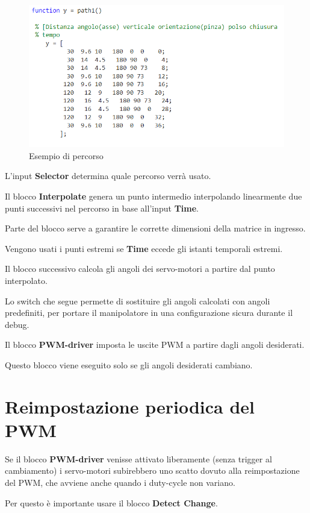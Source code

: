 \documentclass[12pt]{report}
\begin{document}
\begin{figure}
\includegraphics[width=\textwidth]{Path_structure}
\caption{Esempio di percorso}
\end{figure}

L'input \textbf{Selector} determina quale percorso verrà usato.

Il blocco \textbf{Interpolate} genera un punto intermedio interpolando linearmente due punti successivi nel percorso in base all'input \textbf{Time}.

Parte del blocco serve a garantire le corrette dimensioni della matrice in ingresso.

Vengono usati i punti estremi se \textbf{Time} eccede gli istanti temporali estremi.

Il blocco successivo calcola gli angoli dei servo-motori a partire dal punto interpolato.

Lo switch che segue permette di sostituire gli angoli calcolati con angoli predefiniti, per portare il manipolatore in una configurazione sicura durante il debug.

Il blocco \textbf{PWM-driver} imposta le uscite PWM a partire dagli angoli desiderati.

Questo blocco viene eseguito solo se gli angoli desiderati cambiano.

\section{Reimpostazione periodica del PWM}

Se il blocco \textbf{PWM-driver} venisse attivato liberamente (senza trigger al cambiamento) i servo-motori subirebbero uno scatto dovuto alla reimpostazione del PWM, che avviene anche quando i duty-cycle non variano.

Per questo è importante usare il blocco \textbf{Detect Change}. 
\end{document}
